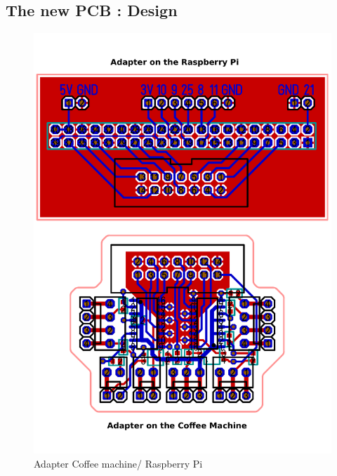 \documentclass[12pt]{article}
\begin{document}
  \subsection{The new PCB : Design}
   \begin{figure}[H]
   \centering
   \includegraphics[width=15cm]{./images/pcb.pdf}
   \captionsetup{justification=centering}
   \caption{Adapter Coffee machine/ Raspberry Pi}
   \label{fig:newPCBDesign}
  \end{figure}
\end{document}
